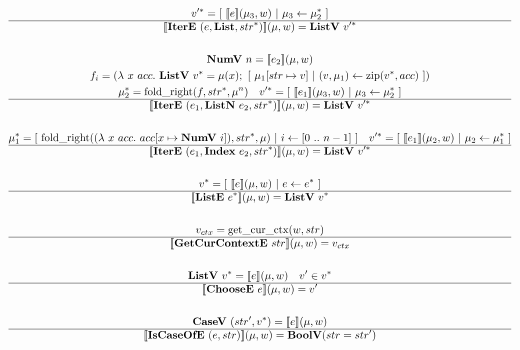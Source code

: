 \begin{gather*}
  \seq{v'} = [ ~ \sem{e}(\mu_3, w) ~ | ~ \mu_3 \leftarrow \seq {\mu_2} ~ ] \\
  \hline
  \sem{\itere ~ (e, \listiter, \seq{str})}(\mu, w) = \listv ~ \seq{v'} \\
%
\newline \\
  \numv ~ n = \sem{e_2}(\mu, w) \\
  f_i =
    (\lambda ~ x ~ acc. ~
      \listv ~ \seq v = \mu(x); ~
      [ ~ \mu_1[str \mapsto v] ~ | ~ (v, \mu_1) \leftarrow \zip (\seq v, acc) ~ ]
    )
  \\
  \seq{\mu_2} = \foldright(f, \seq{str}, \mu^n) \quad
  \seq{v'} = [ ~ \sem{e_1}(\mu_3, w) ~ | ~ \mu_3 \leftarrow \seq {\mu_2} ~ ] \\
  \hline
  \sem{\itere ~ (e_1, \listniter ~ e_2, \seq{str})}(\mu, w) = \listv ~ \seq{v'} \\
%
\newline \\
  \seq{\mu_1} =
    [ ~
      \foldright(
        (\lambda ~ x ~ acc. ~ acc[x \mapsto \numv ~ i]),
        \seq{str},
        \mu
      )
    ~ | ~
      i \leftarrow [0 ~ .. ~ n-1]
    ~ ]
  \quad
  \seq{v'} = [ ~ \sem{e_1}(\mu_2, w) ~ | ~ \mu_2 \leftarrow \seq {\mu_1} ~ ] \\
  \hline
  \sem{\itere ~ (e_1, \listidxiter ~ e_2, \seq{str})}(\mu, w) = \listv ~ \seq{v'} \\
%
\newline \\
  \seq{v} = [ ~ \sem{e}(\mu, w) ~ | ~ e \leftarrow \seq e ~ ] \\
  \hline
  \sem{\liste ~ \seq{e}}(\mu, w) = \listv ~ \seq{v} \\
%
\newline \\
  v_{ctx} = \getcurctx(w, str) \\
  \hline
  \sem{\getcurctxe ~ str}(\mu, w) = v_{ctx} \\
%
\newline \\
  \listv ~ \seq{v} = \sem{e}(\mu, w) \quad
  v' \in \seq{v} \\
  \hline
  \sem{\choosee ~ e}(\mu, w) = v' \\
%
\newline \\
  \casev ~ (str', \seq{v}) = \sem{e}(\mu, w) \\
  \hline
  \sem{\iscaseofe ~ (e, str)}(\mu, w) = \boolv (str = str') \\

\end{gather*}
